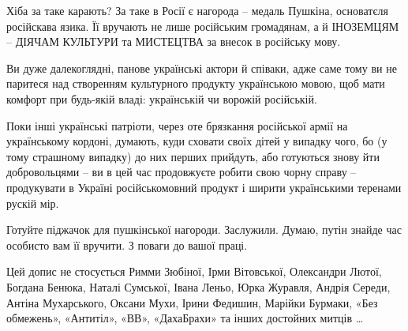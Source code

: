 Хіба за таке карають? За таке в Росії є нагорода – медаль Пушкіна, основатєля
російскава язика. Її вручають не лише російським громадянам, а й ІНОЗЕМЦЯМ –
ДІЯЧАМ КУЛЬТУРИ та МИСТЕЦТВА за внесок в російську мову. 

Ви дуже далекоглядні, панове українські актори й співаки, адже саме тому ви не
паритеся над створенням культурного продукту українською мовою, щоб мати
комфорт при будь-якій владі:  українській чи ворожій російській. 

Поки інші українські патріоти, через оте брязкання російської армії на
українському кордоні, думають, куди сховати своїх дітей у випадку чого, бо (у
тому страшному випадку) до них перших прийдуть, або готуються знову йти
добровольцями – ви в цей час продовжуєте робити свою чорну справу – продукувати
в Україні російськомовний продукт і ширити українськими теренами рускій мір.

Готуйте піджачок для пушкінської нагороди. Заслужили. Думаю, путін знайде час
особисто вам її вручити. З поваги до вашої праці.

Цей допис не стосується Римми Зюбіної, Ірми Вітовської, Олександри Лютої,
Богдана Бенюка, Наталі Сумської, Івана Леньо, Юрка Журавля, Андрія Середи,
Антіна Мухарського, Оксани Мухи, Ірини Федишин, Марійки Бурмаки, «Без
обмежень», «Антитіл», «ВВ», «ДахаБрахи» та інших достойних митців …
